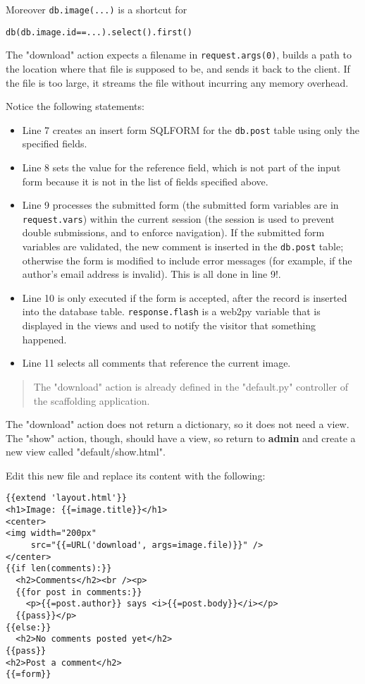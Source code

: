 \documentclass[justified,sixbynine,notoc]{tufte-book}
\def\ft{\small\tt}
\begin{document}
\begin{fullwidth}
Moreover {\ft db.image(...)} is a shortcut for

\begin{lstlisting}
db(db.image.id==...).select().first()
\end{lstlisting}

The "download" action expects a filename in {\ft request.args(0)}, builds a path to the location where that file is supposed to be, and sends it back to the client. If the file is too large, it streams the file without incurring any memory overhead.

Notice the following statements:
\begin{itemize}
\item Line 7 creates an insert form SQLFORM for the {\ft db.post} table using only the specified fields.

\item Line 8 sets the value for the reference field, which is not part of the input form because it is not in the list of fields specified above.

\item Line 9 processes the submitted form (the submitted form variables are in {\ft request.vars}) within the current session (the session is used to prevent double submissions, and to enforce navigation). If the submitted form variables are validated, the new comment is inserted in the {\ft db.post} table; otherwise the form is modified to include error messages (for example, if the author's email address is invalid). This is all done in line 9!.

\item Line 10 is only executed if the form is accepted, after the record is inserted into the database table. {\ft response.flash} is a web2py variable that is displayed in the views and used to notify the visitor that something happened.

\item Line 11 selects all comments that reference the current image.
\end{itemize}

\begin{quote}The "download" action is already defined in the "default.py" controller of the scaffolding application.\end{quote}
The "download" action does not return a dictionary, so it does not need a view. The "show" action, though, should have a view, so return to {\bf admin} and create a new view called "default/show.html".

Edit this new file and replace its content with the following:
\begin{lstlisting}[keywords={}]
{{extend 'layout.html'}}
<h1>Image: {{=image.title}}</h1>
<center>
<img width="200px"
     src="{{=URL('download', args=image.file)}}" />
</center>
{{if len(comments):}}
  <h2>Comments</h2><br /><p>
  {{for post in comments:}}
    <p>{{=post.author}} says <i>{{=post.body}}</i></p>
  {{pass}}</p>
{{else:}}
  <h2>No comments posted yet</h2>
{{pass}}
<h2>Post a comment</h2>
{{=form}}
\end{lstlisting}


\end{fullwidth}
\end{document}
